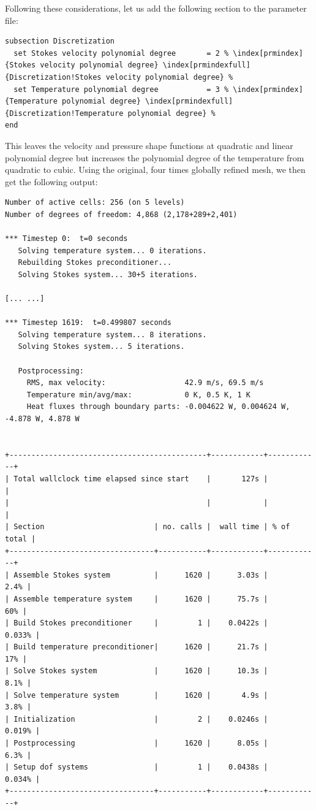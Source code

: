 \documentclass{article}
\begin{document}
Following these considerations, let us add the following section to the
parameter file:
\begin{lstlisting}[frame=single,language=prmfile,escapechar=\%]
subsection Discretization
  set Stokes velocity polynomial degree       = 2 % \index[prmindex]{Stokes velocity polynomial degree} \index[prmindexfull]{Discretization!Stokes velocity polynomial degree} %
  set Temperature polynomial degree           = 3 % \index[prmindex]{Temperature polynomial degree} \index[prmindexfull]{Discretization!Temperature polynomial degree} %
end
\end{lstlisting}
This leaves the velocity and pressure shape functions at quadratic and linear
polynomial degree but increases the polynomial degree of the temperature from
quadratic to cubic. Using the original, four times globally refined mesh, we
then get the following output:
\begin{lstlisting}[frame=single,language=ksh]
Number of active cells: 256 (on 5 levels)
Number of degrees of freedom: 4,868 (2,178+289+2,401)

*** Timestep 0:  t=0 seconds
   Solving temperature system... 0 iterations.
   Rebuilding Stokes preconditioner...
   Solving Stokes system... 30+5 iterations.

[... ...]

*** Timestep 1619:  t=0.499807 seconds
   Solving temperature system... 8 iterations.
   Solving Stokes system... 5 iterations.

   Postprocessing:
     RMS, max velocity:                  42.9 m/s, 69.5 m/s
     Temperature min/avg/max:            0 K, 0.5 K, 1 K
     Heat fluxes through boundary parts: -0.004622 W, 0.004624 W, -4.878 W, 4.878 W


+---------------------------------------------+------------+------------+
| Total wallclock time elapsed since start    |       127s |            |
|                                             |            |            |
| Section                         | no. calls |  wall time | % of total |
+---------------------------------+-----------+------------+------------+
| Assemble Stokes system          |      1620 |      3.03s |       2.4% |
| Assemble temperature system     |      1620 |      75.7s |        60% |
| Build Stokes preconditioner     |         1 |    0.0422s |     0.033% |
| Build temperature preconditioner|      1620 |      21.7s |        17% |
| Solve Stokes system             |      1620 |      10.3s |       8.1% |
| Solve temperature system        |      1620 |       4.9s |       3.8% |
| Initialization                  |         2 |    0.0246s |     0.019% |
| Postprocessing                  |      1620 |      8.05s |       6.3% |
| Setup dof systems               |         1 |    0.0438s |     0.034% |
+---------------------------------+-----------+------------+------------+
\end{lstlisting}
\end{document}
